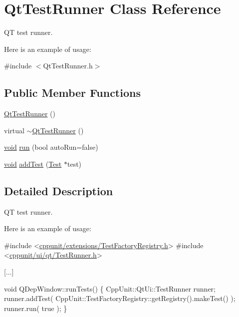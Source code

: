 \hypertarget{class_qt_test_runner}{\section{Qt\-Test\-Runner Class Reference}
\label{class_qt_test_runner}
}


Q\-T test runner.

Here is an example of usage\-:  




{\ttfamily \#include $<$Qt\-Test\-Runner.\-h$>$}

\subsection*{Public Member Functions}
\begin{DoxyCompactItemize}
\item 
\hyperlink{class_qt_test_runner_a6343dbe4e69b8bdd238a4f080619f929}{Qt\-Test\-Runner} ()
\item 
virtual \hyperlink{class_qt_test_runner_a71264fc7621f31989fc510f35b0fd668}{$\sim$\-Qt\-Test\-Runner} ()
\item 
\hyperlink{wglew_8h_aeea6e3dfae3acf232096f57d2d57f084}{void} \hyperlink{class_qt_test_runner_ac3b0f28df1611fd01f83a7b0bcae72e3}{run} (bool auto\-Run=false)
\item 
\hyperlink{wglew_8h_aeea6e3dfae3acf232096f57d2d57f084}{void} \hyperlink{class_qt_test_runner_a31e4c6548007d2c94e277341e7168802}{add\-Test} (\hyperlink{class_test}{Test} $\ast$test)
\end{DoxyCompactItemize}


\subsection{Detailed Description}
Q\-T test runner.

Here is an example of usage\-: 


\begin{DoxyCode}
\textcolor{preprocessor}{#include <\hyperlink{_test_factory_registry_8h}{cppunit/extensions/TestFactoryRegistry.h}>}
\textcolor{preprocessor}{#include <\hyperlink{ui_2qt_2_test_runner_8h}{cppunit/ui/qt/TestRunner.h}>}

[...]

\textcolor{keywordtype}{void} 
QDepWindow::runTests()
\{
  CppUnit::QtUi::TestRunner runner;
  runner.addTest( CppUnit::TestFactoryRegistry::getRegistry().makeTest() );
  runner.run( \textcolor{keyword}{true} );
\}
\end{DoxyCode}
 

